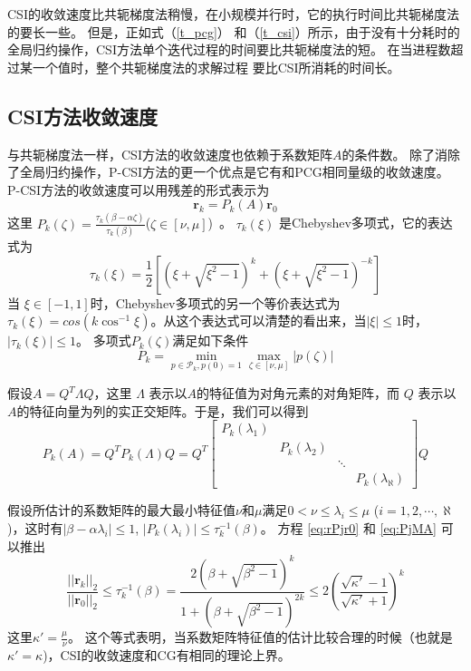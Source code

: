 CSI的收敛速度比共轭梯度法稍慢，在小规模并行时，它的执行时间比共轭梯度法的要长一些。 
但是，正如式（\ref{t_pcg}） 和（\ref{t_csi}）所示，由于没有十分耗时的全局归约操作，CSI方法单个迭代过程的时间要比共轭梯度法的短。 
在当进程数超过某一个值时，整个共轭梯度法的求解过程 要比CSI所消耗的时间长。 


\subsection{CSI方法收敛速度} \label{solver:CSI:convergence_rate}

 
与共轭梯度法一样，CSI方法的收敛速度也依赖于系数矩阵$A$的条件数。  
除了消除了全局归约操作，P-CSI方法的更一个优点是它有和PCG相同量级的收敛速度。 
P-CSI方法的收敛速度可以用残差的形式表示为
\begin{equation}
\textbf{r}_k = P_k(A)\textbf{r}_0 \label{eq:rPjr0}
\end{equation}
这里
$P_k(\zeta) = \frac{\tau_k(\beta-\alpha \zeta)}{\tau_k(\beta)}$($ \zeta \in [\nu, \mu]$)~\cite{stiefel1958kernel}。
$\tau_k(\xi)$ 是Chebyshev多项式，它的表达式为  
\begin{equation*}
\tau_k(\xi) =   \frac{1}{2}[(\xi+\sqrt{\xi^2-1})^k+(\xi+\sqrt{\xi^2-1})^{-k}]
\end{equation*}
当 $ \xi \in [-1,1]$时，Chebyshev多项式的另一个等价表达式为$\tau_k(\xi) = cos(k\cos^{-1} \xi)$。从这个表达式可以清楚的看出来，当$| \xi | \le 1$时，$|\tau_k(\xi)| \le 1$。
多项式$P_k(\zeta)$满足如下条件
\begin{equation}
P_k = \min_{p\in \mathcal{P}_k, p(0) = 1 }\max_{\zeta \in [\nu,\mu]} |p(\zeta)|
\end{equation}


假设$A= Q^T\Lambda Q$，这里 $\Lambda$ 表示以$A$的特征值为对角元素的对角矩阵，而 $Q$ 表示以  $A$的特征向量为列的实正交矩阵。于是，我们可以得到
\begin{equation}
P_k(A) = Q^T P_k(\Lambda)Q = Q^T \left [\begin{array}{cccc}
P_k(\lambda_1) & & &\\
& P_k(\lambda_2) & &\\
& & \ddots &\\
 & & & P_k(\lambda_\aleph)
\end{array} \right ] Q \label{eq:PjMA}
\end{equation}
 
假设所估计的系数矩阵的最大最小特征值$\nu$和$\mu$满足$0 < \nu \le \lambda_i \le \mu$ ($i = 1, 2, \cdots, \aleph$)，这时有$|\beta - \alpha \lambda_i| \le 1$, $|P_k(\lambda_i)| \le \tau^{-1}_k (\beta)$。
方程 \ref{eq:rPjr0} 和 \ref{eq:PjMA} 可以推出
\begin{equation}
\label{csi_convergence}
\frac{||\textbf{r}_k||_2}{||\textbf{r}_0||_2}  \le  \tau_k^{-1}(\beta) = \frac{2(\beta+\sqrt{\beta^2-1})^k}{1+(\beta+\sqrt{\beta^2-1})^{2k}} \le 2(\frac{\sqrt{\kappa'}-1}{\sqrt{\kappa'}+1})^k
\end{equation}
这里$\kappa' = \frac{\mu}{\nu}$。
这个等式表明，当系数矩阵特征值的估计比较合理的时候（也就是$\kappa' =\kappa$)，CSI的收敛速度和CG有相同的理论上界。

